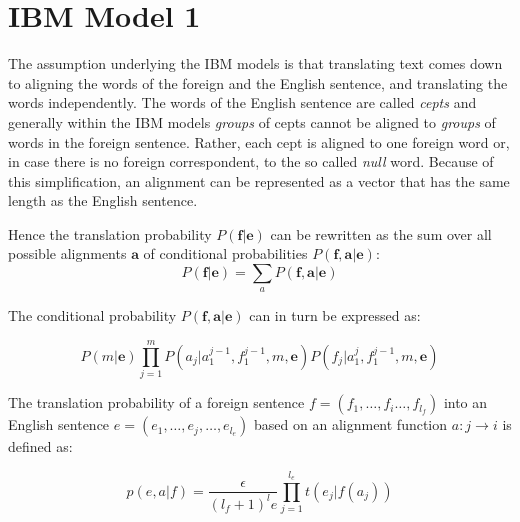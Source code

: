 \documentclass[11pt]{article}
\renewcommand{\vec}[1]{\mathbf{#1}}
\begin{document}
\section{IBM Model 1}
\label{IBM1}

The assumption underlying the IBM models is that translating text comes down to aligning the words 
of the foreign and the English sentence, and translating the words independently.
The words of the English sentence are called \textit{cepts} and generally within the IBM models \emph{groups} of cepts cannot be aligned to \emph{groups} of words in the foreign sentence.  Rather, each cept  is aligned to one foreign word or, in case there is no foreign correspondent, to the so called \textit{null} word.
Because of this simplification, an alignment can be represented as a vector that has the same length as the English sentence.

Hence the translation probability $P(\vec{f}|\vec{e})$ can be rewritten as the sum over all possible alignments $\vec{a}$ of conditional probabilities $P(\vec{f}, \vec{a}|\vec{e})$:
\begin{equation}
P(\vec{f}|\vec{e}) = \sum_a P(\vec{f},\vec{a}|\vec{e})
\end{equation}

The conditional probability $P(\vec{f},\vec{a}|\vec{e})$ can in turn be expressed as:

\begin{equation}
P(m|\vec{e}) \prod_{j=1}^{m} P(a_j|a_1^{j-1}, f_1^{j-1}, m, \vec{e}) P(f_j|a_1^j,f_1^{j-1},m,\vec{e})
\end{equation}



The translation probability of a foreign sentence $f = (f_1,\dots, f_i \dots , f_{l_f})$ into an English sentence $e = (e_1,\dots, e_j,\dots , e_{l_e})$ based on an alignment function $a : j \rightarrow i$ is defined as:

\begin{equation}
p(e,a|f) = \frac{\epsilon}{(l_f + 1)^le} \prod_{j=1}^{l_e}t(e_j|f(a_j))
\end{equation}
\end{document}
